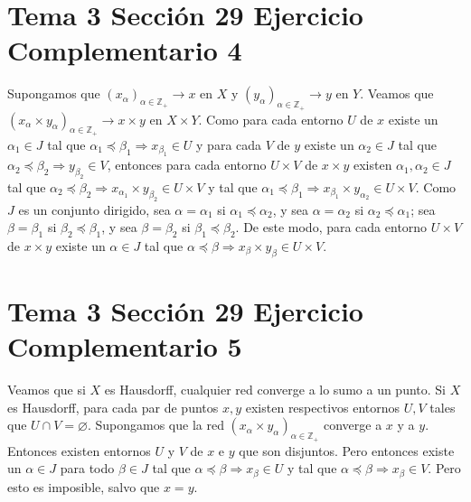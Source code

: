 \documentclass{article}
\begin{document}
\section{Tema 3 Sección 29 Ejercicio Complementario 4}
Supongamos que $(x_\alpha)_{\alpha\in \mathbb{Z}_+}\longrightarrow x$ en $X$ y $(y_\alpha)_{\alpha\in \mathbb{Z}_+}\longrightarrow y$ en $Y$. Veamos que $(x_\alpha\times y_\alpha)_{\alpha\in \mathbb{Z}_+}\longrightarrow x\times y$ en $X\times Y$.
Como para cada entorno $U$ de $x$ existe un $\alpha_1\in J$ tal que $\alpha_1\preceq \beta_1 \Rightarrow x_{\beta_1}\in U$ y para cada $V$ de $y$ existe un $\alpha_2 \in J$ tal que $\alpha_2\preceq \beta_2 \Rightarrow y_{\beta_2} \in V$, entonces para cada entorno $U\times V$ de $x\times y$ existen $\alpha_1,\alpha_2\in J$  tal que $\alpha_2\preceq \beta_2 \Rightarrow x_{\alpha_1}\times y_{\beta_2}\in U\times V$ y tal que $\alpha_1\preceq \beta_1 \Rightarrow x_{\beta_1}\times y_{\alpha_2}\in U\times V$. Como $J$ es un conjunto dirigido, sea $\alpha=\alpha_1$ si $\alpha_1\preceq \alpha_2$, y sea $\alpha=\alpha_2$ si $\alpha_2\preceq \alpha_1$; sea $\beta=\beta_1$ si $\beta_2\preceq \beta_1$, y sea $\beta=\beta_2$ si $\beta_1\preceq \beta_2$. De este modo, para cada entorno $U\times V$ de $x\times y$ existe un $\alpha \in J$ tal que $\alpha \preceq \beta\Rightarrow x_\beta\times y_\beta \in U\times V$.
\section{Tema 3 Sección 29 Ejercicio Complementario 5}
Veamos que si $X$ es Hausdorff, cualquier red converge a lo sumo a un punto. Si $X$ es Hausdorff, para cada par de puntos $x, y$ existen respectivos entornos $U,V$ tales que $U\cap V=\varnothing$. Supongamos que la red $(x_\alpha\times y_\alpha)_{\alpha\in \mathbb{Z}_+}$ converge a $x$ y a $y$. Entonces existen entornos $U$ y $V$ de $x$ e $y$ que son disjuntos. Pero entonces existe un $\alpha \in J$ para todo $\beta\in J$ tal que $\alpha\preceq \beta \Rightarrow x_\beta\in U$ y tal que $\alpha\preceq \beta\Rightarrow x_\beta\in V$. Pero esto es imposible, salvo que $x=y$.
\end{document}
